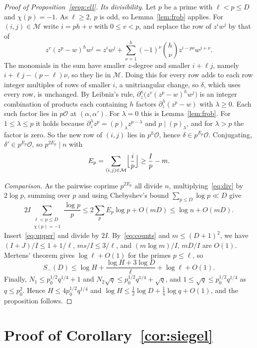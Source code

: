 \documentclass[11pt]{amsart}
\theoremstyle{remark}
\newcommand{\cO}{\mathcal{O}}
\newcommand{\cM}{\mathcal{M}}
\begin{document}
\begin{proof}[Proof of Proposition~\ref{prop:ell}]
\emph{Its divisibility.} Let $p$ be a prime with $\ell<p\le D$ and $\chi(p)=-1$. As $\ell\ge2$, $p$ is
odd, so Lemma~\ref{lem:frob} applies. For $(i,j)\in\cM$ write $i=ph+v$ with $0\le v<p$, and replace
the row of $z^iw^j$ by that of
\[
z^v(z^p-w)^hw^j=z^iw^j+\sum_{\nu=1}^{h}(-1)^\nu\binom h\nu z^{i-p\nu}w^{j+\nu}.
\]
The monomials in the sum have smaller $z$-degree and smaller $i+\ell j$, namely $i+\ell j-(p-\ell)\nu$, so they
lie in $\cM$. Doing this for every
row adds to each row integer multiples of rows of smaller $i$, a unitriangular change, so $\delta$,
which uses every row, is unchanged. By Leibniz's rule,
$\partial_z^\kappa\bigl(z^v(z^p-w)^hw^j\bigr)$ is an integer combination of products each containing
$h$ factors $\partial_z^\lambda(z^p-w)$ with $\lambda\ge0$. Each such factor lies in $p\cO$ at
$(\alpha,\alpha')$. For $\lambda=0$ this is Lemma~\ref{lem:frob}. For $1\le\lambda\le p$ it holds because
$\partial_z^\lambda z^p=(p)_\lambda z^{p-\lambda}$ and $p\mid(p)_\lambda$, and for $\lambda>p$ the factor is
zero. So the new row of $(i,j)$ lies in $p^h\cO$, hence $\delta\in p^{E_p}\cO$. Conjugating,
$\delta'\in p^{E_p}\cO$, so $p^{2E_p}\mid n$ with
\begin{equation}\label{eq:div}
E_p=\sum_{(i,j)\in\cM}\Bigl\lfloor\frac ip\Bigr\rfloor\ge\frac Ip-m.
\end{equation}

\emph{Comparison.} As the pairwise coprime $p^{2E_p}$ all divide $n$, multiplying~\eqref{eq:div}
by $2\log p$, summing over $p$ and using Chebyshev's bound $\sum_{p\le D}\log p\ll D$ give
\[
2I\sum_{\substack{\ell<p\le D\\ \chi(p)=-1}}\frac{\log p}p\le2\sum_pE_p\log p+O(mD)\le\log n+O(mD).
\]
Insert~\eqref{eq:upper} and divide by $2I$. By~\eqref{eq:counts} and $m\le(D+1)^2$, we have
$(I+J)/I\le1+1/\ell$, $ms/I\le3/\ell$, and $(m\log m)/I$, $mD/I$ are $O(1)$. Mertens'
theorem gives $\log\ell+O(1)$ for the primes $p\le\ell$, so
\begin{equation}\label{eq:shape}
S_-(D)\le\log H+\frac{\log H+3\log D}\ell+\log\ell+O(1).
\end{equation}
Finally, $N_1\le p_0^{1/2}q^{1/4}+1$ and
$N_2\sqrt q\le p_0^{1/2}q^{1/4}+\sqrt q$, and $1\le\sqrt q\le p_0^{1/2}q^{1/4}$ as $q\le p_0^2$.
Hence $H\le4p_0^{1/2}q^{1/4}$ and $\log H\le\frac12\log D+\frac14\log q+O(1)$, and the proposition
follows.
\end{proof}

\section{Proof of Corollary~\ref{cor:siegel}}\label{sec:cor}
\end{document}
